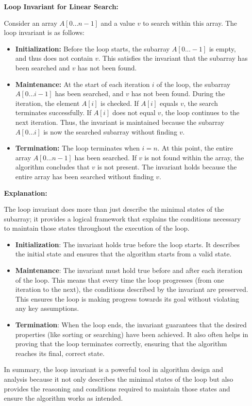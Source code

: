 \documentclass{article}
\begin{document}
\textbf{Loop Invariant for Linear Search:}

Consider an array \( A[0 \ldots n-1] \) and a value \( v \) to search within this array. The loop invariant is as follows:

\begin{itemize}
    \item \textbf{Initialization:} Before the loop starts, the subarray \( A[0 \ldots -1] \) is empty, and thus does not contain \( v \). This satisfies the invariant that the subarray has been searched and \( v \) has not been found.
    
    \item \textbf{Maintenance:} At the start of each iteration \( i \) of the loop, the subarray \( A[0 \ldots i-1] \) has been searched, and \( v \) has not been found. During the iteration, the element \( A[i] \) is checked. If \( A[i] \) equals \( v \), the search terminates successfully. If \( A[i] \) does not equal \( v \), the loop continues to the next iteration. Thus, the invariant is maintained because the subarray \( A[0 \ldots i] \) is now the searched subarray without finding \( v \).
    
    \item \textbf{Termination:} The loop terminates when \( i = n \). At this point, the entire array \( A[0 \ldots n-1] \) has been searched. If \( v \) is not found within the array, the algorithm concludes that \( v \) is not present. The invariant holds because the entire array has been searched without finding \( v \).
\end{itemize}

\textbf{Explanation:}

The loop invariant does more than just describe the minimal states of the subarray; it provides a logical framework that explains the conditions necessary to maintain those states throughout the execution of the loop.

\begin{itemize}
    \item \textbf{Initialization}: The invariant holds true before the loop starts. It describes the initial state and ensures that the algorithm starts from a valid state.
    
    \item \textbf{Maintenance}: The invariant must hold true before and after each iteration of the loop. This means that every time the loop progresses (from one iteration to the next), the conditions described by the invariant are preserved. This ensures the loop is making progress towards its goal without violating any key assumptions.
    
    \item \textbf{Termination}: When the loop ends, the invariant guarantees that the desired properties (like sorting or searching) have been achieved. It also often helps in proving that the loop terminates correctly, ensuring that the algorithm reaches its final, correct state.
\end{itemize}

In summary, the loop invariant is a powerful tool in algorithm design and analysis because it not only describes the minimal states of the loop but also provides the reasoning and conditions required to maintain those states and ensure the algorithm works as intended.
\end{document}
